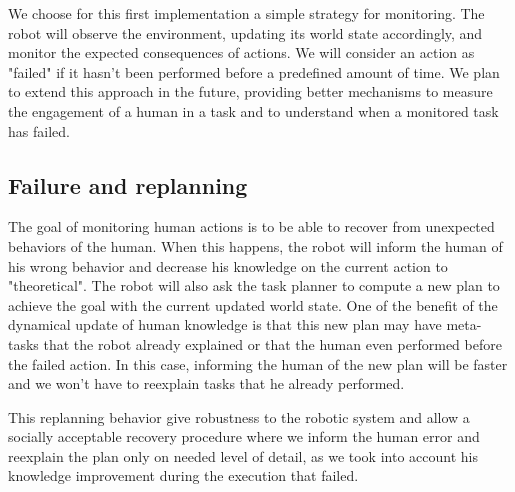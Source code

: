 \documentclass{llncs}
\begin{document}
We choose for this first implementation a simple strategy for monitoring. The robot will observe the environment, updating its world state accordingly, and monitor the expected consequences of actions. We will consider an action as "failed" if it hasn't been performed before a predefined amount of time. 
We plan to extend this approach in the future, providing better mechanisms to measure the engagement of a human in a task and to understand when a monitored task has failed.


\subsection{Failure and replanning}

The goal of monitoring human actions is to be able to recover from unexpected behaviors of the human. When this happens, the robot will inform the human of his wrong behavior and decrease his knowledge on the current action to "theoretical". 
The robot will also ask the task planner to compute a new plan to achieve the goal with the current updated world state.
One of the benefit of the dynamical update of human knowledge is that this new plan may have meta-tasks that the robot already explained or that the human even performed before the failed action. In this case, informing the human of the new plan will be faster and we won't have to reexplain tasks that he already performed.

This replanning behavior give robustness to the robotic system and allow a socially acceptable recovery procedure where we inform the human error and reexplain the plan only on needed level of detail, as we took into account his knowledge improvement during the execution that failed.



\end{document}
